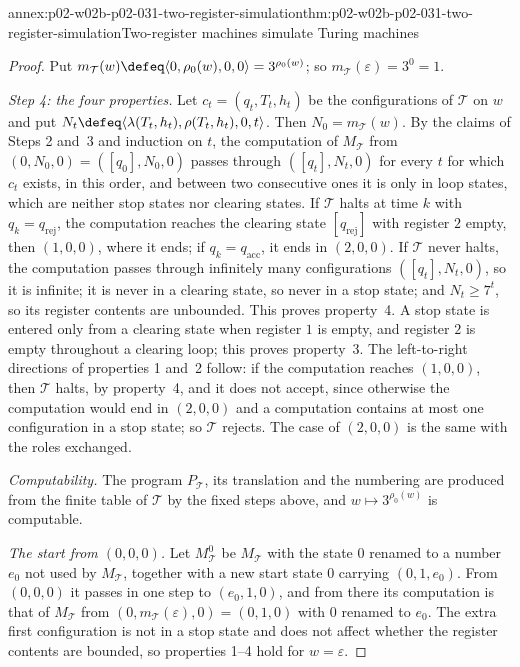 \begin{annexitem}{annex:p02-w02b-p02-031-two-register-simulation}{thm:p02-w02b-p02-031-two-register-simulation}{Two-register machines simulate Turing machines}
\begin{proof}
Put \(m_{\mathcal T}(w)\defeq\langle0,\rho_0(w),0,0\rangle=3^{\rho_0(w)}\);
so \(m_{\mathcal T}(\varepsilon)=3^{0}=1\).

\emph{Step 4: the four properties.}  Let \(c_t=(q_t,T_t,h_t)\) be the
configurations of \(\mathcal T\) on \(w\) and put \(N_t\defeq\langle
\lambda(T_t,h_t),\rho(T_t,h_t),0,t\rangle\).  Then \(N_0=m_{\mathcal T}(w)\).
By the claims of Steps 2 and~3 and induction on \(t\), the computation of
\(M_{\mathcal T}\) from \((0,N_0,0)=([q_0],N_0,0)\) passes through
\(([q_t],N_t,0)\) for every \(t\) for which \(c_t\) exists, in this order,
and between two consecutive ones it is only in loop states, which are
neither stop states nor clearing states.  If \(\mathcal T\) halts at time
\(k\) with \(q_k=q_{\mathrm{rej}}\), the computation reaches the clearing state
\([q_{\mathrm{rej}}]\) with register \(2\) empty, then \((1,0,0)\), where it
ends; if \(q_k=q_{\mathrm{acc}}\), it ends in \((2,0,0)\).  If \(\mathcal T\)
never halts, the computation passes through infinitely many configurations
\(([q_t],N_t,0)\), so it is infinite; it is never in a clearing state, so
never in a stop state; and \(N_t\geq7^{t}\), so its register contents are
unbounded.  This proves property~4.  A stop state is entered only from a
clearing state when register \(1\) is empty, and register \(2\) is empty
throughout a clearing loop; this proves property~3.  The left-to-right
directions of properties 1 and~2 follow: if the computation reaches
\((1,0,0)\), then \(\mathcal T\) halts, by property~4, and it does not accept,
since otherwise the computation would end in \((2,0,0)\) and a computation
contains at most one configuration in a stop state; so \(\mathcal T\) rejects.
The case of \((2,0,0)\) is the same with the roles exchanged.

\emph{Computability.}  The program \(P_{\mathcal T}\), its translation and the
numbering are produced from the finite table of \(\mathcal T\) by the fixed
steps above, and \(w\mapsto3^{\rho_0(w)}\) is computable.

\emph{The start from \((0,0,0)\).}  Let \(M^{0}_{\mathcal T}\) be
\(M_{\mathcal T}\) with the state \(0\) renamed to a number \(e_0\) not used
by \(M_{\mathcal T}\), together with a new start state \(0\) carrying
\((0,1,e_0)\).  From \((0,0,0)\) it passes in one step to \((e_0,1,0)\), and
from there its computation is that of \(M_{\mathcal T}\) from
\((0,m_{\mathcal T}(\varepsilon),0)=(0,1,0)\) with \(0\) renamed to \(e_0\).
The extra first configuration is not in a stop state and does not affect
whether the register contents are bounded, so properties 1--4 hold for
\(w=\varepsilon\).
\end{proof}
\end{annexitem}

